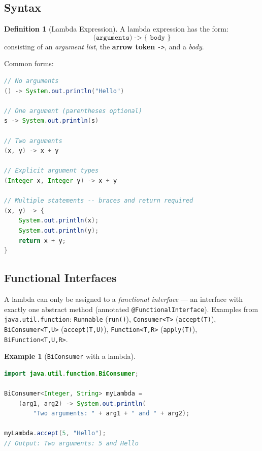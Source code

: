 \documentclass[11pt, a4paper, notitlepage]{report}
\theoremstyle{definition}
\newtheorem{definition}[theorem]{Definition}
\theoremstyle{remark}
\theoremstyle{definition}
\newtheorem{example}[theorem]{Example}
\begin{document}
\subsection{Syntax}
\label{subsec:ch10-lambda-syntax}

\begin{definition}[Lambda Expression]
\label{def:ch10-lambda}
A lambda expression has the form:
\[
  \texttt{(arguments)} \;\texttt{->}\; \texttt{\{\ body\ \}}
\]
consisting of an \emph{argument list}, the \textbf{arrow token} \texttt{->}, and a
\emph{body}.
\end{definition}

Common forms:

\begin{lstlisting}[language=Java]
// No arguments
() -> System.out.println("Hello")

// One argument (parentheses optional)
s -> System.out.println(s)

// Two arguments
(x, y) -> x + y

// Explicit argument types
(Integer x, Integer y) -> x + y

// Multiple statements -- braces and return required
(x, y) -> {
    System.out.println(x);
    System.out.println(y);
    return x + y;
}
\end{lstlisting}

\subsection{Functional Interfaces}
\label{subsec:ch10-functional-interfaces}

A lambda can only be assigned to a \emph{functional interface} — an interface with exactly
one abstract method (annotated \texttt{@FunctionalInterface}).  Examples from
\texttt{java.util.function}: \texttt{Runnable} (\texttt{run()}), \texttt{Consumer<T>}
(\texttt{accept(T)}), \texttt{BiConsumer<T,U>} (\texttt{accept(T,U)}),
\texttt{Function<T,R>} (\texttt{apply(T)}), \texttt{BiFunction<T,U,R>}.

\begin{example}[\texttt{BiConsumer} with a lambda]
\leavevmode
\begin{lstlisting}[language=Java]
import java.util.function.BiConsumer;

BiConsumer<Integer, String> myLambda =
    (arg1, arg2) -> System.out.println(
        "Two arguments: " + arg1 + " and " + arg2);

myLambda.accept(5, "Hello");
// Output: Two arguments: 5 and Hello
\end{lstlisting}
\end{example}
\end{document}
